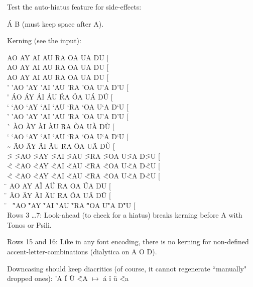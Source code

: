 \documentclass{article}
\newcommand{\LGR}{\fontencoding{LGR}\selectfont}
\newcommand{\Latin}{\fontencoding{\encodingdefault}\selectfont}
\begin{document}
\newpage

\Latin Test the auto-hiatus feature for side-effects:

\LGR \MakeUppercase{\'a b} (\Latin must keep space after A).

Kerning (see the input):
\LGR
\newcommand\md{\textcompwordmark}
\newcommand\MU{\MakeUppercase}

  \md \MU{ AO    AY    AI    AU    RA    OA    UA    DU}    [ \\
\<\md \MU{ \<AO  \<AY  \<AI  \<AU  \<RA  \<OA  U\<A  D\<U}  [ \\
\>\md \MU{ \>AO  \>AY  \>AI  \>AU  \>RA  \>OA  U\>A  D\>U}  [ \\
\>'\md\MU{ \>'AO \>'AY \>'AI \>'AU \>'RA \>'OA U\>'A D\>'U} [ \\
\'\md \MU{ \'AO  \'AY  \'AI  \'AU  \'RA  \'OA  U\'A  D\'U}  [ \\
\>`\md\MU{ \>`AO \>`AY \>`AI \>`AU \>`RA \>`OA U\>`A D\>`U} [ \\
\<'\md\MU{ \<'AO \<'AY \<'AI \<'AU \<'RA \<'OA U\<'A D\<'U} [ \\
\`\md \MU{ \`AO  \`AY  \`AI  \`AU  \`RA  \`OA  U\`A  D\`U}  [ \\
\<`\md\MU{ \<`AO \<`AY \<`AI \<`AU \<`RA \<`OA U\<`A D\<`U} [ \\
\~\md \MU{ \~AO  \~AY  \~AI  \~AU  \~RA  \~OA  U\~A  D\~U}  [ \\
\~>\md\MU{ \~>AO \~>AY \~>AI \~>AU \~>RA \~>OA U\~>A D\~>U} [ \\
\~<\md\MU{ \~<AO \~<AY \~<AI \~<AU \~<RA \~<OA U\~<A D\~<U} [ \\
\~<\md\MU{ \~<ao \~<ay \~<ai \~<au \~<ra \~<oa u\~<a d\~<u} [ \\
\"\md \MU{ AO    AY    A\"I  A\"U  RA    OA    \"UA  DU}    [ \\
\"\md \MU{ \"AO  \"AY  \"AI  \"AU  \"RA  \"OA  U\"A  D\"U}  [ \\
\"~\md\MU{ \~"AO \~"AY \~"AI \~"AU \~"RA \~"OA U\~"A D\~"U} [ \\


\Latin
Rows 3 \ldots 7: Look-ahead (to check for a hiatus) breaks kerning before A
with Tonos or Psili.


Rows 15 and 16: Like in any font encoding, there is no kerning for
non-defined accent-letter-combinations (dialytica on \LGR A O D\Latin).

\Latin

Downcasing should keep diacritics (of course, it cannot regenerate
``manually" dropped ones):
\LGR 'A \"I \"U \~<A $\mapsto$ \MakeLowercase{\'A \"I \"U \~<A}

\end{document}
